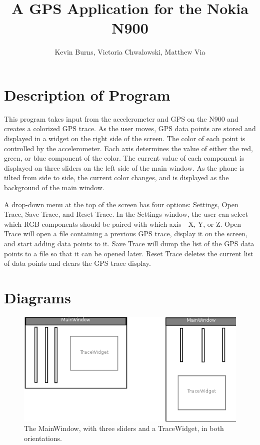 \documentclass[12pt]{article}
\begin{document}
\title{A GPS Application for the Nokia N900}
\author{Kevin Burns, Victoria Chwalowski, Matthew Via}
\date{}
\maketitle

\section{Description of Program}
This program takes input from the accelerometer and GPS on the N900 and creates
a colorized GPS trace. As the user moves, GPS data points are stored and
displayed in a widget on the right side of the screen. The color of each point is controlled by the
accelerometer. Each axis determines the value of either the red, green, or blue
component of the color. The current value of each component is displayed on
three sliders on the left side of the main window. As the phone is tilted from side to side, the current
color changes, and is displayed as the background of the main window. 

A drop-down menu at the top of the screen has four options: Settings, Open
Trace, Save Trace, and Reset Trace. In the Settings window, the user can select
which RGB components should be paired with which axis - X, Y, or Z. Open Trace
will open a file containing a previous GPS trace, display it on the screen, and
start adding data points to it. Save Trace will dump the list of the GPS data
points to a file so that it can be opened later. Reset Trace deletes the current
list of data points and clears the GPS trace display.

\section{Diagrams}
\begin{figure}[H]
  \centering
    \includegraphics{mainwindow.png}
  \caption{The MainWindow, with three sliders and a TraceWidget, in both
  orientations.}
\end{figure}
\end{document}
